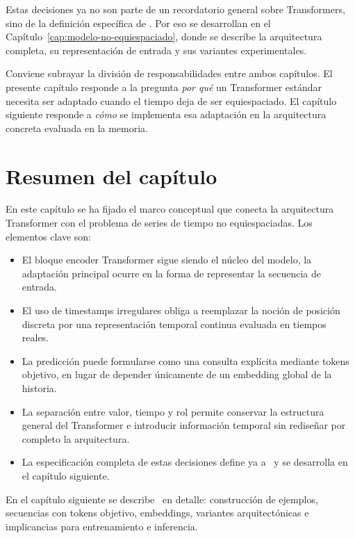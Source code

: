 Estas decisiones ya no son parte de un recordatorio general sobre Transformers, sino de la definición específica de \CTTransformer. Por eso se desarrollan en el Capítulo~\ref{cap:modelo-no-equiespaciado}, donde se describe la arquitectura completa, su representación de entrada y sus variantes experimentales.

Conviene subrayar la división de responsabilidades entre ambos capítulos. El presente capítulo responde a la pregunta \emph{por qué} un Transformer estándar necesita ser adaptado cuando el tiempo deja de ser equiespaciado. El capítulo siguiente responde a \emph{cómo} se implementa esa adaptación en la arquitectura concreta evaluada en la memoria.

\section{Resumen del capítulo}

En este capítulo se ha fijado el marco conceptual que conecta la arquitectura Transformer con el problema de series de tiempo no equiespaciadas. Los elementos clave son:

\begin{itemize}
    \item El bloque encoder Transformer sigue siendo el núcleo del modelo, la adaptación principal ocurre en la forma de representar la secuencia de entrada.
    \item El uso de timestamps irregulares obliga a reemplazar la noción de posición discreta por una representación temporal continua evaluada en tiempos reales.
    \item La predicción puede formularse como una consulta explícita mediante tokens objetivo, en lugar de depender únicamente de un embedding global de la historia.
    \item La separación entre valor, tiempo y rol permite conservar la estructura general del Transformer e introducir información temporal sin rediseñar por completo la arquitectura.
    \item La especificación completa de estas decisiones define ya a \CTTransformer\ y se desarrolla en el capítulo siguiente.
\end{itemize}

En el capítulo siguiente se describe \CTTransformer\ en detalle: construcción de ejemplos, secuencias con tokens objetivo, embeddings, variantes arquitectónicas e implicancias para entrenamiento e inferencia.
